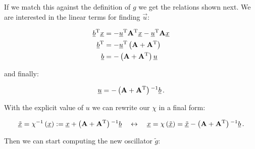 \documentclass[a4paper,10pt]{article}
\begin{document}
If we match this against the definition of $g$ we get the
relations shown next. We are interested in the linear terms
for finding $\vec{u}$:

\begin{equation}
\begin{split}
  \underline{b}{}^{\textnormal{T}} \underline{x} & = - \underline{u}{}^{\textnormal{T}} \mathbf{A}{}^{\textnormal{T}} \underline{x} - \underline{u}{}^{\textnormal{T}} \mathbf{A} \underline{x} \\
  \underline{b}{}^{\textnormal{T}}         & = - \underline{u}{}^{\textnormal{T}} \left(\mathbf{A} + \mathbf{A}{}^{\textnormal{T}}\right) \\
  \underline{b}           & = - \left(\mathbf{A} + \mathbf{A}{}^{\textnormal{T}}\right) \underline{u} \\
\end{split}
\end{equation}

and finally:

\begin{equation}
  \underline{u} = - \left(\mathbf{A} + \mathbf{A}{}^{\textnormal{T}}\right){}^{-1} \underline{b} \,.
\end{equation}

With the explicit value of $u$ we can rewrite our $\chi$ in a final form:

\begin{equation}
 \underline{\tilde{x}} = \chi^{-1}\left(\underline{x}\right) := \underline{x} + \left(\mathbf{A} + \mathbf{A}{}^{\textnormal{T}}\right){}^{-1} \underline{b}
 \quad \leftrightarrow \quad
 \underline{x} = \chi\left(\underline{\tilde{x}}\right) = \underline{\tilde{x}} - \left(\mathbf{A} + \mathbf{A}{}^{\textnormal{T}}\right){}^{-1} \underline{b} \,.
\end{equation}

Then we can start computing the new oscillator $\tilde{g}$:
\end{document}
